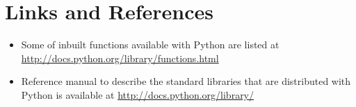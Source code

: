 \documentclass[12pt]{article}
\begin{document}
\section{Links and References}
\begin{itemize}
\item Some of inbuilt functions available with Python are listed at\\ \url{http://docs.python.org/library/functions.html}
\item Reference manual to describe the standard libraries  that are distributed with Python is available at \url{http://docs.python.org/library/} 
\end{itemize}
\end{document}
